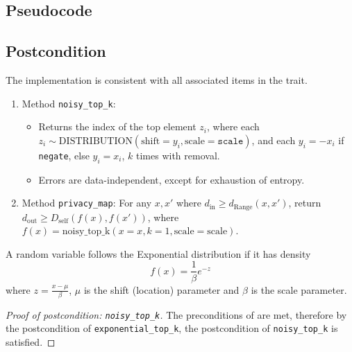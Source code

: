\documentclass{article}
\begin{document}
\subsection*{Pseudocode} 
\label{sec:python-pseudocode} 
 
 
\subsection*{Postcondition} 
\begin{theorem}
    The implementation is consistent with all associated items in the  trait.
    \begin{enumerate}
        \item Method \texttt{noisy\_top\_k}: 
        \begin{itemize}
            \item Returns the index of the top element $z_i$,
            where each $z_i \sim \mathrm{DISTRIBUTION}(\mathrm{shift}=y_i, \mathrm{scale}=\texttt{scale})$,
            and each $y_i = -x_i$ if \texttt{negate}, else $y_i = x_i$,
            $k$ times with removal.
            \item Errors are data-independent, except for exhaustion of entropy.
        \end{itemize}
        \item Method \texttt{privacy\_map}: 
        For any $x, x'$ where $d_\mathrm{in} \ge d_\mathrm{Range}(x, x')$,
        return $d_\mathrm{out} \ge D_\mathrm{self}(f(x), f(x'))$,
        where $f(x) = \mathrm{noisy\_top\_k}(x=x, k=1, \mathrm{scale}=\mathrm{scale})$.
    \end{enumerate}
\end{theorem}


\begin{definition}
    \label{def:Exponential}
    A random variable follows the Exponential distribution if it has density
    \begin{equation}
        f(x) = \frac{1}{\beta} e^{-z}
    \end{equation}
    where $z = \frac{x - \mu}{\beta}$,
    $\mu$ is the shift (location) parameter and $\beta$ is the scale parameter.
\end{definition}

\begin{proof}[Proof of postcondition: \texttt{noisy\_top\_k}]
    The preconditions of  are met,
    therefore by the postcondition of \texttt{exponential\_top\_k},
    the postcondition of \texttt{noisy\_top\_k} is satisfied.
\end{proof}
\end{document}
